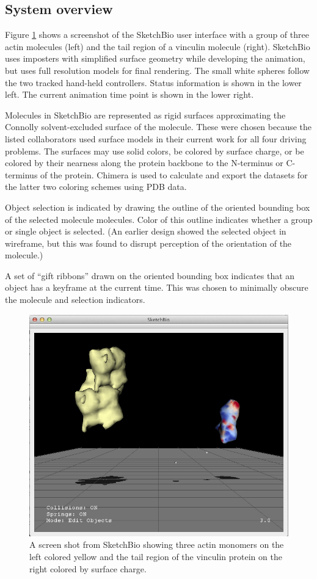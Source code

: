 \documentclass[twocolumn]{bmcart}%
\begin{document}
\subsection*{System overview}

Figure \ref{fig:actin_vinculin} shows a screenshot of the SketchBio user interface with a group of three actin molecules (left) and the tail region of a vinculin molecule (right).
SketchBio uses imposters with simplified surface geometry while developing the animation, but uses full resolution models for final rendering.
The small white spheres follow the two tracked hand-held controllers. Status information is shown in the lower left.
The current animation time point is shown in the lower right.

Molecules in SketchBio are represented as rigid surfaces approximating the Connolly solvent-excluded surface of the molecule.
These were chosen because the listed collaborators used surface models in their current work for all four driving problems.  The surfaces may use solid colors, be colored by surface charge, or be colored by their nearness along the protein backbone to the N-terminus or C-terminus of the protein.  Chimera is used to calculate and export the datasets for the latter two coloring schemes using PDB data.

Object selection is indicated by drawing the outline of the oriented bounding box of the selected molecule molecules. 
Color of this outline indicates whether a group or single object is selected.
(An earlier design showed the selected object in wireframe, but this was found to disrupt perception of the orientation of the molecule.)

A set of ``gift ribbons'' drawn on the oriented bounding box indicates that an object has a keyframe at the current time.
This was chosen to minimally obscure the molecule and selection indicators.

\begin{figure}[ht]
\centering
\includegraphics[width=0.9\columnwidth]{actinVinculin.png}
\caption{A screen shot from SketchBio showing three actin monomers on the left colored yellow and the tail region of the vinculin protein on the right colored by surface charge.}
\label{fig:actin_vinculin}
\end{figure}
\end{document}
